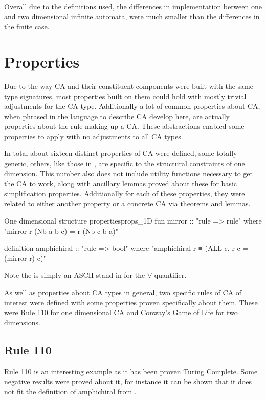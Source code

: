 Overall due to the definitions used,
the differences in implementation between one and two dimensional infinite automata,
were much smaller than the differences in the finite case.


\section{Properties}

Due to the way CA and their constituent components were built with the same type signatures,
most properties built on them could hold with mostly trivial adjustments for the CA type.
Additionally a lot of common properties about CA, 
when phrased in the language to describe CA develop here,
are actually properties about the rule making up a CA.
These abstractions enabled some properties to apply with no adjustments to all CA types.

In total about sixteen distinct properties of CA were defined,
some totally generic,
others,
like those in ,
are specific to the structural constraints of one dimension.
This number also does not include utility functions necessary to get the CA to work,
along with ancillary lemmas proved about these for basic simplification properties.
Additionally for each of these properties,
they were related to either another property or a concrete CA via theorems and lemmas.

\begin{myminted}{One dimensional structure properties}{props_1D}
    fun mirror :: "rule => rule" where
    "mirror r (Nb a b c) = r (Nb c b a)"

    definition amphichiral :: "rule => bool" where
    "amphichiral r ≡ (ALL c. r c = (mirror r) c)"
\end{myminted}

Note the  is simply an ASCII stand in for the $\forall$ quantifier.


As well as properties about CA types in general,
two specific rules of CA of interest were defined with some properties proven specifically about them.
These were Rule 110 for one dimensional CA and Conway's Game of Life for two dimensions.

\subsection{Rule 110}
Rule 110 is an interesting example as it has been proven Turing Complete.
Some negative results were proved about it,
for instance it can be shown that it does not fit the definition of amphichiral from .

